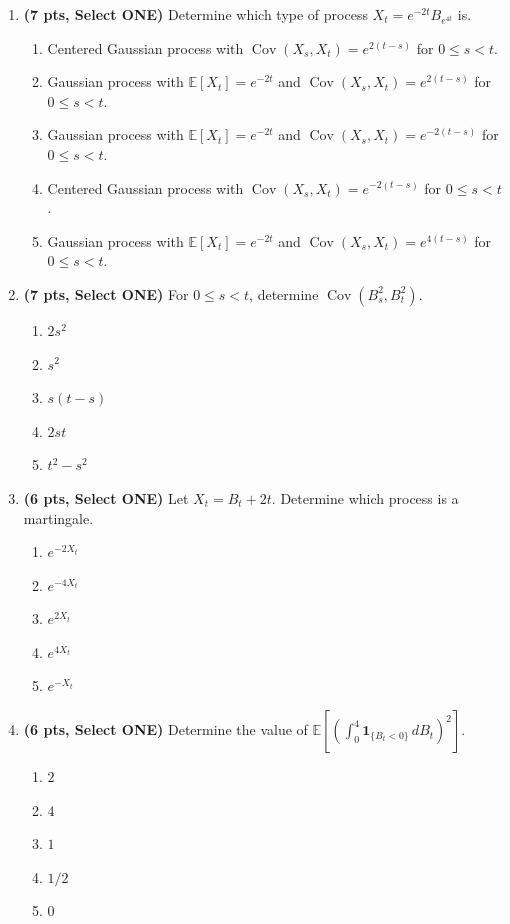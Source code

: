 \documentclass[11pt]{article}
\newcommand{\E}{\mathbb{E}}
\DeclareMathOperator{\Cov}{Cov}
\begin{document}
\begin{enumerate}
\item[\textbf{Q5.}] \textbf{(7 pts, Select ONE)} Determine which type of process $X_t=e^{-2t}B_{e^{4t}}$ is.
\begin{enumerate}
  \item Centered Gaussian process with $\Cov(X_s,X_t)=e^{2(t-s)}$ for $0\le s<t$.
  \item Gaussian process with $\E[X_t]=e^{-2t}$ and $\Cov(X_s,X_t)=e^{2(t-s)}$ for $0\le s<t$.
  \item Gaussian process with $\E[X_t]=e^{-2t}$ and $\Cov(X_s,X_t)=e^{-2(t-s)}$ for $0\le s<t$.
  \item Centered Gaussian process with $\Cov(X_s,X_t)=e^{-2(t-s)}$ for $0\le s<t$.
  \item Gaussian process with $\E[X_t]=e^{-2t}$ and $\Cov(X_s,X_t)=e^{4(t-s)}$ for $0\le s<t$.
\end{enumerate}

\item[\textbf{Q6.}] \textbf{(7 pts, Select ONE)} For $0\le s<t$, determine $\Cov(B_s^2,B_t^2)$.
\begin{enumerate}
  \item $2s^2$
  \item $s^2$
  \item $s(t-s)$
  \item $2st$
  \item $t^2-s^2$
\end{enumerate}

\item[\textbf{Q7.}] \textbf{(6 pts, Select ONE)} Let $X_t=B_t+2t$. Determine which process is a martingale.
\begin{enumerate}
  \item $e^{-2X_t}$
  \item $e^{-4X_t}$
  \item $e^{2X_t}$
  \item $e^{4X_t}$
  \item $e^{-X_t}$
\end{enumerate}

\item[\textbf{Q8.}] \textbf{(6 pts, Select ONE)} Determine the value of $\displaystyle\E\left[\left(\int_0^4\mathbf 1_{\{B_t<0\}}\,dB_t\right)^2\right]$.
\begin{enumerate}
  \item $2$
  \item $4$
  \item $1$
  \item $1/2$
  \item $0$
\end{enumerate}


\end{enumerate}
\end{document}
